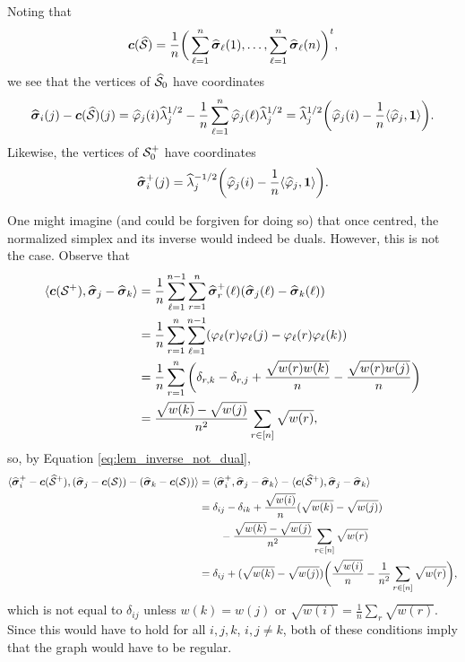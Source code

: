 Noting that 
\begin{equation*}
\vb*{c}(\widehat{\mathcal{S}}) = \frac{1}{n}\bigg(\sum_{\ell=1}^n \widehat{\vb*{\sigma}}_\ell(1),\dots,\sum_{\ell=1}^n \widehat{\vb*{\sigma}}_\ell(n)\bigg)^t,
\end{equation*}
we see that the vertices of $\widehat{\mathcal{S}}_0$ have coordinates
\begin{equation*}
\widehat{\vb*{\sigma}}_i(j) - \vb*{c}(\widehat{\mathcal{S}})(j) = \widehat{\varphi}_j(i)\widehat{\lambda}_j^{1/2} - \frac{1}{n}\sum_{\ell=1}^n \widehat{\varphi}_j(\ell)\widehat{\lambda}_j^{1/2} = \widehat{\lambda}_j^{1/2} \bigg(\widehat{\varphi}_j(i) - \frac{1}{n}\langle \widehat{\varphi}_j,\vb{1}\rangle \bigg).
\end{equation*}
Likewise, the vertices of $\mathcal{S}_0^+$ have coordinates 
\begin{equation*}
\widehat{\vb*{\sigma}}_i^+(j) = \widehat{\lambda}_j^{-1/2}\bigg(\widehat{\varphi}_j(i) - \frac{1}{n}\langle \widehat{\varphi}_j,\vb{1}\rangle\bigg).
\end{equation*}

One might imagine (and could be forgiven for doing so) that once centred, the normalized simplex and its inverse would indeed be duals. However, this is not the case. Observe that 
\begin{align*}
\langle \vb*{c}(\mathcal{S}^+),\widehat{\vb*{\sigma}}_j-\widehat{\vb*{\sigma}}_k\rangle &= \frac{1}{n}\sum_{\ell=1}^{n-1} \sum_{r=1}^n \widehat{\vb*{\sigma}}^+_r(\ell)(\widehat{\vb*{\sigma}}_j(\ell)-\widehat{\vb*{\sigma}}_k(\ell))  \\&= 
\frac{1}{n}\sum_{r=1}^n \sum_{\ell=1}^{n-1} (\varphi_\ell(r)\varphi_\ell(j) - \varphi_\ell(r)\varphi_\ell(k) ) \\
&= \frac{1}{n} \sum_{r=1}^n \bigg(\delta_{r,k} - \delta_{r,j} + \frac{\sqrt{w(r)w(k)}}{n} - \frac{\sqrt{w(r)w(j)}}{n}\bigg) \\
&= \frac{\sqrt{w(k)}-\sqrt{w(j)}}{n^2} \sum_{r\in[n]}\sqrt{w(r)},
\end{align*}
so, by Equation \eqref{eq:lem_inverse_not_dual},
\begin{align*}
\langle \widehat{\vb*{\sigma}}_i^+-\vb*{c}(\widehat{\mathcal{S}}^+),(\widehat{\vb*{\sigma}}_j-\vb*{c}(\mathcal{S})) - (\widehat{\vb*{\sigma}}_k-\vb*{c}(\mathcal{S}))\rangle &= \langle \widehat{\vb*{\sigma}}_i^+,\widehat{\vb*{\sigma}}_j-\widehat{\vb*{\sigma}}_k\rangle - \langle \vb*{c}(\widehat{\mathcal{S}}^+),\widehat{\vb*{\sigma}}_j-\widehat{\vb*{\sigma}}_k\rangle \\
&= \delta_{ij} - \delta_{ik} + \frac{\sqrt{w(i)}}{n}(\sqrt{w(k)} - \sqrt{w(j)})  \\
&\qquad - \frac{\sqrt{w(k)}-\sqrt{w(j)}}{n^2} \sum_{r\in[n]}\sqrt{w(r)} \\
&= \delta_{ij} + (\sqrt{w(k)}-\sqrt{w(j)})\bigg(\frac{\sqrt{w(i)}}{n} - \frac{1}{n^2}\sum_{r\in[n]}\sqrt{w(r)}\bigg),
\end{align*}
which is not equal to $\delta_{ij}$ unless $w(k)=w(j)$ or $\sqrt{w(i)}= \frac{1}{n}\sum_r \sqrt{w(r)}$. Since this would have to hold for all $i,j,k$, $i,j\neq k$, both of these conditions imply that the graph would have to be regular. 







